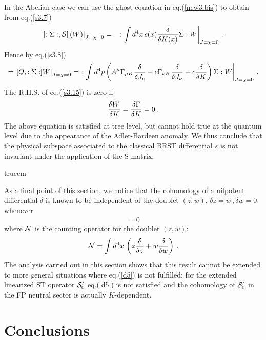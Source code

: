 \documentclass[a4paper,11pt]{article}
\def\G{\Gamma}
\begin{document}
%
In the Abelian case we can use the ghost equation in eq.(\ref{new3.bis})
 to obtain 
from eq.(\ref{s3.7})
%
\begin{eqnarray}
\left . \left [ : \Sigma :, {\cal S} \right ] (W) \right |_{J=\chi=0} & = &
\left . : \int d^4x \, c(x) {\delta \over \delta K(x)} \Sigma : W 
\right |_{J=\chi=0} \, .
\label{s3.8}
\end{eqnarray}
%
Hence by eq.(\ref{s3.8})
%
\begin{eqnarray}
[Q, S] = \left . [Q , : \Sigma: ] W \right |_{J=\chi=0} =
\left .  : \int d^4p \left ( A^\mu \G_{\mu K} {\delta \over \delta J_c} 
-c \G_{\nu K} {\delta \over \delta J_\nu} + c {\delta \over \delta K}
\right ) \Sigma : W\right |_{J=\chi=0} \, .
\label{s3.15}
\end{eqnarray}
%
The R.H.S. of eq.(\ref{s3.15}) is zero if 
%
\begin{eqnarray}
{\delta W \over \delta K} = {\delta \G \over \delta K} = 0 \, .
\label{s3.16}
\end{eqnarray}
%
The above equation is satisfied at tree level, but cannot hold
true at the quantum level due to the appearance of the Adler-Bardeen
anomaly. 
We thus conclude that the physical subspace associated to the classical BRST differential $s$ 
is not invariant under the application of the S matrix.
 

 truecm

As a final point of this section, we notice that
the cohomology of a nilpotent differential $\delta$
is known to be independent of the doublet $(z,w)$,
$\delta z = w \, , \delta w = 0$
whenever \cite{PS}
%
\begin{eqnarray}
[\delta, {\cal N}] = 0
\label{d5}
\end{eqnarray}
%
where ${\cal N}$ is the counting operator for the doublet $(z,w)$:
%
\begin{eqnarray}
{\cal N} = \int d^4x \, \left ( z {\delta \over \delta z}
+ w {\delta \over \delta w} \right ) \, .
\label{d6}
\end{eqnarray}
%
The analysis carried out in this section
shows that this result cannot be extended to more
general situations where eq.(\ref{d5}) is not fulfilled:
 for the extended linearized ST operator
${\cal S}'_0$  eq.(\ref{d5}) is not satisfied and
the cohomology of ${\cal S}'_0$ in the FP neutral sector
is actually $K$-dependent.
  

\section{Conclusions}
\end{document}
